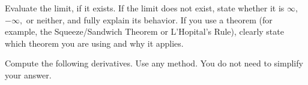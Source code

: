 \documentclass[addpoints,12pt]{exam}
\begin{document}
\begin{questions}


\question
Evaluate the limit, if it exists. If the limit does not exist, state whether it is $\infty,$ $-\infty,$ or
neither, and fully explain its behavior. If you use a theorem (for example, the Squeeze/Sandwich
Theorem or L'Hopital's Rule), clearly state which theorem you are using and why it applies.


\newpage




\question Compute the following derivatives. Use any method. You do not need to simplify your
answer.

\end{questions}
\end{document}
